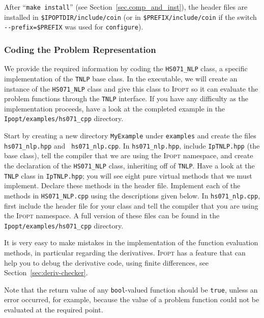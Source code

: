\documentclass[10pt]{article}
\newcommand{\Ipopt}{\textsc{Ipopt}\xspace}
\begin{document}
After ``\texttt{make install}'' (see Section~\ref{sec.comp_and_inst}),
the header files are installed in \texttt{\$IPOPTDIR/include/coin}
(or in \texttt{\$PREFIX/include/coin} if the switch
\verb|--prefix=$PREFIX| was used for {\tt configure}).  %

\subsubsection{Coding the Problem Representation}\label{sec.cpp_problem}
We provide the required information
by coding the {\tt HS071\_NLP} class, a specific implementation of the
{\tt TNLP} base class. In the executable, we will create an instance
of the {\tt HS071\_NLP} class and give this class to \Ipopt so it can
evaluate the problem functions through the {\tt TNLP} interface. If
you have any difficulty as the implementation proceeds, have a look at
the completed example in the {\tt Ipopt/examples/hs071\_cpp} directory.

Start by creating a new directory {\tt MyExample} under {\tt examples} and 
create the files {\tt hs071\_nlp.hpp} and {\tt
  hs071\_nlp.cpp}. In {\tt hs071\_nlp.hpp}, include {\tt IpTNLP.hpp}
(the base class), tell the compiler that we are using the \Ipopt
namespace, and create the declaration of the {\tt HS071\_NLP} class,
inheriting off of {\tt TNLP}. Have a look at the {\tt TNLP} class in
{\tt IpTNLP.hpp}; you will see eight pure virtual methods that we must
implement. Declare these methods in the header file.  Implement each
of the methods in {\tt HS071\_NLP.cpp} using the descriptions given
below. In {\tt hs071\_nlp.cpp}, first include the header file for your
class and tell the compiler that you are using the \Ipopt namespace.
A full version of these files can be found in the {\tt
  Ipopt/examples/hs071\_cpp} directory.

It is very easy to make mistakes in the implementation of the function
evaluation methods, in particular regarding the derivatives.  \Ipopt
has a feature that can help you to debug the derivative code, using
finite differences, see Section~\ref{sec:deriv-checker}.

Note that the return value of any {\tt bool}-valued function should be
{\tt true}, unless an error occurred, for example, because the value of
a problem function could not be evaluated at the required point.
\end{document}
